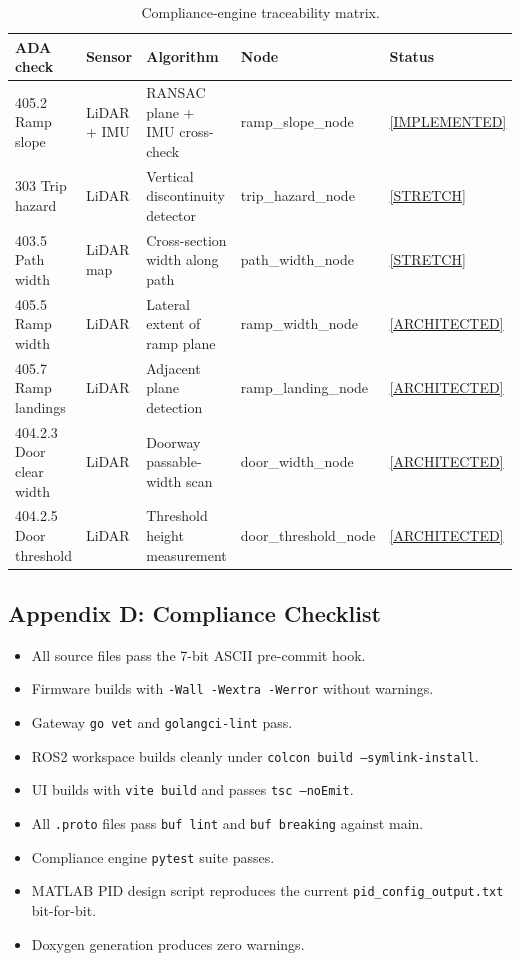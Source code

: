 \documentclass[11pt,letterpaper]{article}
\newcommand{\statuslabel}[1]{\hyperref[sec:status-legend]{[#1]}}
\begin{document}
\begin{table}[H]
\centering
\caption{Compliance-engine traceability matrix.}
\label{tab:trace}
\scriptsize
\begin{tabularx}{\linewidth}{l l X l l}
\toprule
\textbf{ADA check} & \textbf{Sensor} & \textbf{Algorithm} & \textbf{Node} & \textbf{Status} \\
\midrule
405.2 Ramp slope          & LiDAR + IMU  & RANSAC plane + IMU cross-check & ramp\_slope\_node     & \statuslabel{IMPLEMENTED} \\
303 Trip hazard           & LiDAR        & Vertical discontinuity detector & trip\_hazard\_node    & \statuslabel{STRETCH} \\
403.5 Path width          & LiDAR map    & Cross-section width along path  & path\_width\_node     & \statuslabel{STRETCH} \\
405.5 Ramp width          & LiDAR        & Lateral extent of ramp plane    & ramp\_width\_node     & \statuslabel{ARCHITECTED} \\
405.7 Ramp landings       & LiDAR        & Adjacent plane detection        & ramp\_landing\_node   & \statuslabel{ARCHITECTED} \\
404.2.3 Door clear width  & LiDAR        & Doorway passable-width scan     & door\_width\_node     & \statuslabel{ARCHITECTED} \\
404.2.5 Door threshold    & LiDAR        & Threshold height measurement    & door\_threshold\_node & \statuslabel{ARCHITECTED} \\
\bottomrule
\end{tabularx}
\end{table}

\subsection*{Appendix D: Compliance Checklist}

\begin{itemize}[leftmargin=1.4em,itemsep=2pt]
\item[$\square$] All source files pass the 7-bit ASCII pre-commit
      hook.
\item[$\square$] Firmware builds with \texttt{-Wall -Wextra -Werror}
      without warnings.
\item[$\square$] Gateway \texttt{go vet} and \texttt{golangci-lint}
      pass.
\item[$\square$] ROS2 workspace builds cleanly under \texttt{colcon
      build --symlink-install}.
\item[$\square$] UI builds with \texttt{vite build} and passes
      \texttt{tsc --noEmit}.
\item[$\square$] All \texttt{.proto} files pass \texttt{buf lint} and
      \texttt{buf breaking} against main.
\item[$\square$] Compliance engine \texttt{pytest} suite passes.
\item[$\square$] MATLAB PID design script reproduces the current
      \texttt{pid\_config\_output.txt} bit-for-bit.
\item[$\square$] Doxygen generation produces zero warnings.
\end{itemize}
\end{document}
